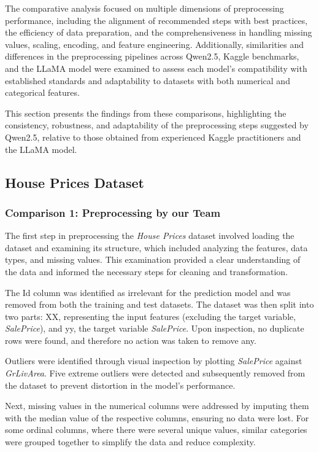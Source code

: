 The comparative analysis focused on multiple dimensions of preprocessing
performance, including the alignment of recommended steps with best practices,
the efficiency of data preparation, and the comprehensiveness in handling
missing values, scaling, encoding, and feature engineering. Additionally,
similarities and differences in the preprocessing pipelines across Qwen2.5,
Kaggle benchmarks, and the LLaMA model were examined to assess each model's
compatibility with established standards and adaptability to datasets with both
numerical and categorical features.

This section presents the findings from these comparisons, highlighting the
consistency, robustness, and adaptability of the preprocessing steps suggested
by Qwen2.5, relative to those obtained from experienced Kaggle practitioners
and the LLaMA model.

\subsection{House Prices Dataset}

\subsubsection{Comparison 1: Preprocessing by our Team}

The first step in preprocessing the \textit{House Prices} dataset involved
loading the dataset and examining its structure, which included analyzing the
features, data types, and missing values. This examination provided a clear
understanding of the data and informed the necessary steps for cleaning and
transformation.

The Id column was identified as irrelevant for the prediction model and was
removed from both the training and test datasets. The dataset was then split
into two parts: XX, representing the input features (excluding the target
variable, \textit{SalePrice}), and yy, the target variable \textit{SalePrice}.
Upon inspection, no duplicate rows were found, and therefore no action was
taken to remove any.

Outliers were identified through visual inspection by plotting
\textit{SalePrice} against \textit{GrLivArea}. Five extreme outliers were
detected and subsequently removed from the dataset to prevent distortion in the
model's performance.

Next, missing values in the numerical columns were addressed by imputing them
with the median value of the respective columns, ensuring no data were lost.
For some ordinal columns, where there were several unique values, similar
categories were grouped together to simplify the data and reduce complexity.

